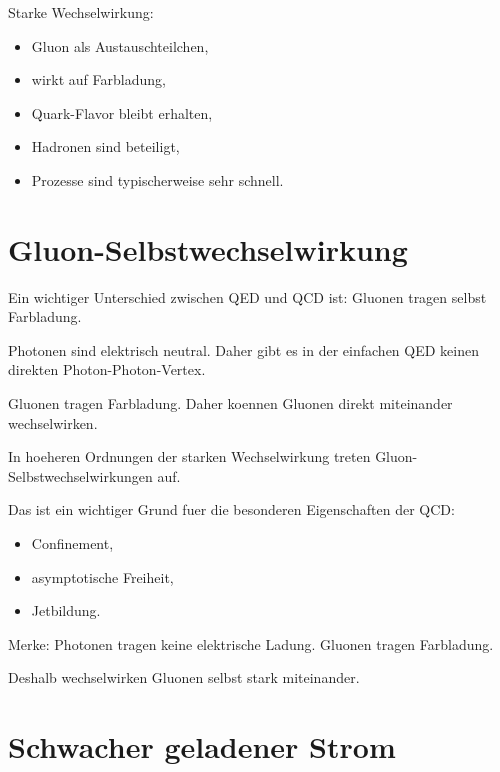 \begin{examtipbox}
Starke Wechselwirkung:
\begin{itemize}
    \item Gluon als Austauschteilchen,
    \item wirkt auf Farbladung,
    \item Quark-Flavor bleibt erhalten,
    \item Hadronen sind beteiligt,
    \item Prozesse sind typischerweise sehr schnell.
\end{itemize}
\end{examtipbox}

\section{Gluon-Selbstwechselwirkung}

Ein wichtiger Unterschied zwischen QED und QCD ist:
Gluonen tragen selbst Farbladung.

\begin{conceptbox}
Photonen sind elektrisch neutral.
Daher gibt es in der einfachen QED keinen direkten Photon-Photon-Vertex.

Gluonen tragen Farbladung.
Daher koennen Gluonen direkt miteinander wechselwirken.
\end{conceptbox}

\begin{notebox}
In hoeheren Ordnungen der starken Wechselwirkung treten Gluon-Selbstwechselwirkungen
auf.

Das ist ein wichtiger Grund fuer die besonderen Eigenschaften der QCD:
\begin{itemize}
    \item Confinement,
    \item asymptotische Freiheit,
    \item Jetbildung.
\end{itemize}
\end{notebox}

\begin{examtipbox}
Merke:
Photonen tragen keine elektrische Ladung.
Gluonen tragen Farbladung.

Deshalb wechselwirken Gluonen selbst stark miteinander.
\end{examtipbox}

\section{Schwacher geladener Strom}

